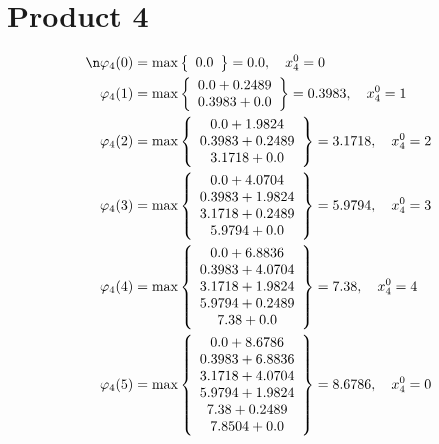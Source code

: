 \documentclass{article}
\begin{document}
\section{Product 4}
\begin{align*}
\n  
  
\varphi_{4}(0) &= \max \left\{ \begin{array}{c}
0.0
\end{array} \right\}=0.0,\quad x_{4}^0=0\\
  
  
  
  
\varphi_{4}(1) &= \max \left\{ \begin{array}{c}
0.0 + 0.2489 \\
 0.3983 + 0.0
\end{array} \right\}=0.3983,\quad x_{4}^0=1\\
  
  
  
  
\varphi_{4}(2) &= \max \left\{ \begin{array}{c}
0.0 + 1.9824 \\
 0.3983 + 0.2489 \\
 3.1718 + 0.0
\end{array} \right\}=3.1718,\quad x_{4}^0=2\\
  
  
  
  
\varphi_{4}(3) &= \max \left\{ \begin{array}{c}
0.0 + 4.0704 \\
 0.3983 + 1.9824 \\
 3.1718 + 0.2489 \\
 5.9794 + 0.0
\end{array} \right\}=5.9794,\quad x_{4}^0=3\\
  
  
  
  
\varphi_{4}(4) &= \max \left\{ \begin{array}{c}
0.0 + 6.8836 \\
 0.3983 + 4.0704 \\
 3.1718 + 1.9824 \\
 5.9794 + 0.2489 \\
 7.38 + 0.0
\end{array} \right\}=7.38,\quad x_{4}^0=4\\
  
  
  
  
\varphi_{4}(5) &= \max \left\{ \begin{array}{c}
0.0 + 8.6786 \\
 0.3983 + 6.8836 \\
 3.1718 + 4.0704 \\
 5.9794 + 1.9824 \\
 7.38 + 0.2489 \\
 7.8504 + 0.0
\end{array} \right\}=8.6786,\quad x_{4}^0=0\\
  

\end{align*}
\end{document}
